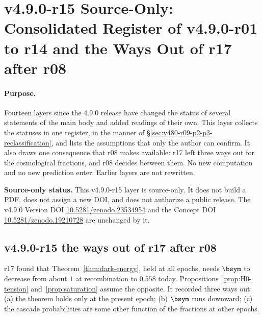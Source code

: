 \clearpage
\section*{v4.9.0-r15 Source-Only: Consolidated Register of v4.9.0-r01 to r14 and the Ways Out of r17 after r08}
\label{sec:v490-r15-consolidated-register}

\paragraph{Purpose.}
Fourteen layers since the 4.9.0 release have changed the status of several statements of the main body and added
readings of their own.  This layer collects the statuses in one register, in the manner of
\S\ref{sec:v480-r09-p2-p3-reclassification}, and lists the assumptions that only the author can confirm.  It also draws one
consequence that r08 makes available: r17 left three ways out for the cosmological fractions, and r08 decides between
them.  No new computation and no new prediction enter.  Earlier layers are not rewritten.

\noindent\textbf{Source-only status.}
This v4.9.0-r15 layer is source-only.  It does not build a PDF, does not assign a new DOI,
and does not authorize a public release.  The v4.9.0 Version DOI
\href{https://doi.org/10.5281/zenodo.23534954}{10.5281/zenodo.23534954} and the Concept DOI
\href{https://doi.org/10.5281/zenodo.19210728}{10.5281/zenodo.19210728} are unchanged by it.

\subsection*{v4.9.0-r15 the ways out of r17 after r08}
\label{subsec:v490-r15-r17-ways}

r17 found that Theorem~\ref{thm:dark-energy}, held at all epochs, needs \(\bsym\) to decrease from about \(1\) at
recombination to \(0.558\) today.  Propositions~\ref{prop:H0-tension} and~\ref{prop:saturation} assume the opposite.  It
recorded three ways out: (a) the theorem holds only at the present epoch; (b) \(\bsym\) runs downward; (c) the cascade
probabilities are some other function of the fractions at other epochs.

